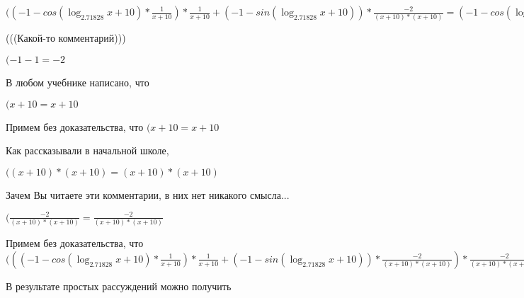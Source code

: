 \documentclass[12pt,a4paper,fleqn]{article}
\theoremstyle{definition}
\begin{document}
$(( -1  - cos(\log_{ 2.71828 }{ x  +  10 }) * \frac{ 1 }{ x  +  10 }
) * \frac{ 1 }{ x  +  10 }
 + ( -1  - sin(\log_{ 2.71828 }{ x  +  10 })) * \frac{ -2 }{( x  +  10 ) * ( x  +  10 )}
 = ( -1  - cos(\log_{ 2.71828 }{ x  +  10 }) * \frac{ 1 }{ x  +  10 }
) * \frac{ 1 }{ x  +  10 }
 + ( -1  - sin(\log_{ 2.71828 }{ x  +  10 })) * \frac{ -2 }{( x  +  10 ) * ( x  +  10 )}
$

(((Какой-то комментарий)))

$( -1  -  1  =  -2 $

В любом учебнике написано, что

$( x  +  10  =  x  +  10 $

Примем без доказательства, что
$( x  +  10  =  x  +  10 $

Как рассказывали в начальной школе,

$(( x  +  10 ) * ( x  +  10 ) = ( x  +  10 ) * ( x  +  10 )$

Зачем Вы читаете эти комментарии, в них нет никакого смысла...

$(\frac{ -2 }{( x  +  10 ) * ( x  +  10 )}
 = \frac{ -2 }{( x  +  10 ) * ( x  +  10 )}
$

Примем без доказательства, что
$((( -1  - cos(\log_{ 2.71828 }{ x  +  10 }) * \frac{ 1 }{ x  +  10 }
) * \frac{ 1 }{ x  +  10 }
 + ( -1  - sin(\log_{ 2.71828 }{ x  +  10 })) * \frac{ -2 }{( x  +  10 ) * ( x  +  10 )}
) * \frac{ -2 }{( x  +  10 ) * ( x  +  10 )}
 = (( -1  - cos(\log_{ 2.71828 }{ x  +  10 }) * \frac{ 1 }{ x  +  10 }
) * \frac{ 1 }{ x  +  10 }
 + ( -1  - sin(\log_{ 2.71828 }{ x  +  10 })) * \frac{ -2 }{( x  +  10 ) * ( x  +  10 )}
) * \frac{ -2 }{( x  +  10 ) * ( x  +  10 )}
$

В результате простых рассуждений можно получить
\end{document}
